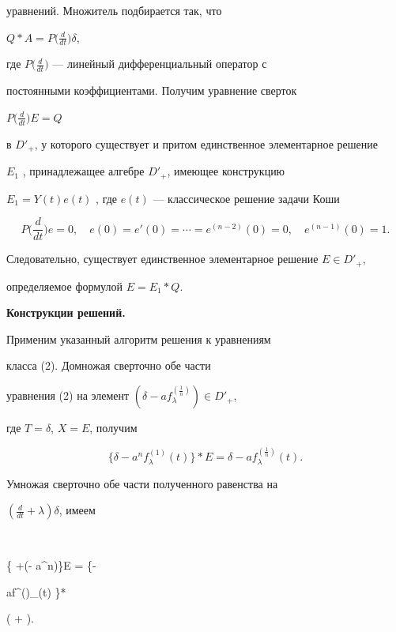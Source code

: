 уравнений. Множитель подбирается так, что


$Q\ast A=P\big(\frac{d}{dt}\big)\delta$,


где $P\big(\frac{d}{dt}\big)$ --- линейный дифференциальный оператор с


постоянными коэффициентами. Получим уравнение сверток


$P\big(\frac{d}{dt}\big)E=Q$


в $D'_+$, у которого существует и притом единственное элементарное решение


$E_1$ , принадлежащее алгебре $D'_+$, имеющее конструкцию


$E_1=Y(t)e(t)$ , где $e(t)$ --- классическое решение задачи Коши


$$


P\bigg(\frac{d}{dt}\bigg)e=0,\quad


e(0)=e'(0)=\dotsb =e^{(n-2)}(0)=0,\quad e^{(n-1)}(0)=1.


$$


Следовательно, существует единственное элементарное решение $E\in D'_+$,


определяемое формулой $E=E_1\ast Q$.


\medskip





{\bf Конструкции решений.}


Применим указанный алгоритм решения к уравнениям 


класса (2). Домножая сверточно обе части


уравнения (2) на элемент $(\delta -af^{(\frac{1}{n})}_\lambda) \in D'_+$,


где $T=\delta$, $X=E$, получим


$$


\{\delta - a^nf^{(1)}_\lambda (t) \}*E=\delta -


af^{(\frac{1}{n})}_\lambda (t). 


$$





Умножая сверточно обе части полученного равенства на


$(\frac{d}{dt}+\lambda )\delta$, имеем


$$


\bigg\{ +(\lambda - a^n)\bigg\}E = \big\{\delta -


af^{()}_\lambda (t) \big\}*


\bigg( + \lambda\bigg)\delta.


